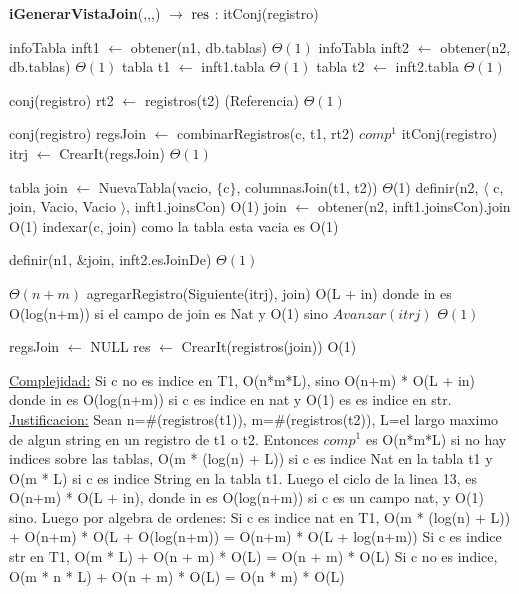 \begin{algorithm}[H]{\textbf{iGenerarVistaJoin}(,,,) $\to$ $\res$ : itConj(registro) }
    	\begin{algorithmic}[1]
    		\State infoTabla inft1 $\gets$ obtener(n1, db.tablas)     \Comment $\Theta(1)$
    		\State infoTabla inft2 $\gets$ obtener(n2, db.tablas)     \Comment $\Theta(1)$
    		\State tabla t1 $\gets$ inft1.tabla         \Comment $\Theta(1)$
    		\State tabla t2 $\gets$ inft2.tabla         \Comment $\Theta(1)$
    		
    		\State conj(registro) rt2 $\gets$ registros(t2)         \Comment (Referencia) $\Theta(1)$

    		\State conj(registro) regsJoin $\gets$ combinarRegistros(c, t1, rt2)   \Comment $comp^{1}$
    		\State itConj(registro) itrj $\gets$ CrearIt(regsJoin)        \Comment $\Theta(1)$

    		\State tabla join $\gets$ NuevaTabla(vacio, $\lbrace$c$\rbrace$, columnasJoin(t1, t2))	\Comment $\Theta$(1)
    		\State definir(n2,  $\langle$ c, join, Vacio, Vacio $\rangle$, inft1.joinsCon)     \Comment O(1)
			\State join $\gets$ obtener(n2, inft1.joinsCon).join				\Comment O(1)
    		\State indexar(c, join)																\Comment como la tabla esta vacia es O(1) 
    		
    		\State definir(n1, \&join, inft2.esJoinDe)  \Comment $\Theta(1)$
    		

			               														\Comment $\Theta(n+m)$
			 	\State agregarRegistro(Siguiente(itrj), join)	\Comment O(L + in) donde in es O(log(n+m)) si el campo de join es Nat y O(1) sino
			 	\State $Avanzar(itrj)$	                     											 	\Comment $\Theta(1)$
			 \EndWhile    	    		

			\State regsJoin $\gets$ NULL    		
			\State res $\gets$ CrearIt(registros(join))							\Comment  O(1)
    		
			\medskip
			\Statex \underline{Complejidad:} Si c no es indice en T1, O(n*m*L), sino O(n+m) * O(L + in) donde in es O(log(n+m)) si c es indice en nat y O(1) es es indice en str.
			\Statex \underline{Justificacion:} Sean n=\#(registros(t1)),  m=\#(registros(t2)), L=el largo maximo de algun string en un registro de t1 o t2. Entonces  $comp^{1}$ es O(n*m*L) si no hay indices sobre las tablas, O(m * (log(n) + L)) si c es indice Nat en la tabla t1 y O(m * L) si c es indice String en la tabla t1. 
			\Statex Luego el ciclo de la linea 13, es O(n+m) * O(L + in), donde in es O(log(n+m)) si c es un campo nat, y O(1) sino.
			\Statex Luego por algebra de ordenes: 
			\Statex Si c es indice nat en T1, O(m * (log(n) + L)) + O(n+m) * O(L + O(log(n+m)) = O(n+m) * O(L + log(n+m)) 
			\Statex Si c es indice str en T1, O(m * L) + O(n + m) * O(L) = O(n + m) * O(L)
			\Statex Si c no es indice,  O(m * n * L) + O(n + m) * O(L) = O(n * m) * O(L)
			
    	\end{algorithmic}
\end{algorithm}




